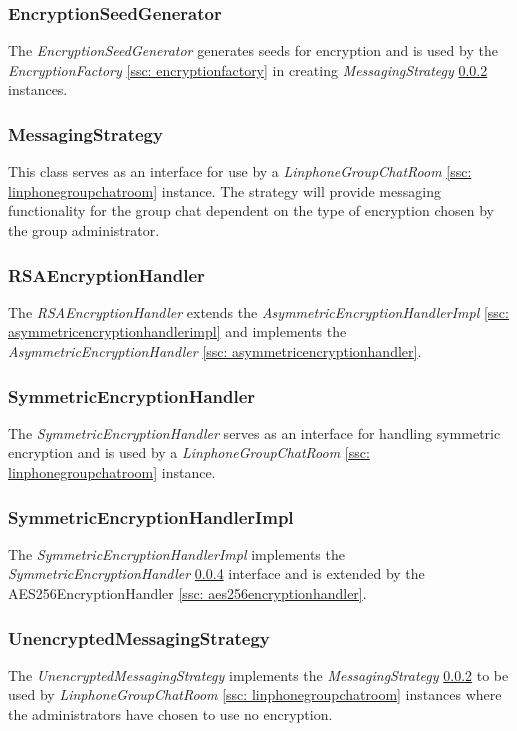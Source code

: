 \documentclass[11pt]{article}
\begin{document}
\subsubsection{EncryptionSeedGenerator}\label{ssc: encryptionseedgenerator}
The \textit{EncryptionSeedGenerator} generates seeds for encryption and is used by the \textit{EncryptionFactory} \ref{ssc: encryptionfactory} in creating \textit{MessagingStrategy} \ref{ssc: messagingstrategy} instances.
\subsubsection{MessagingStrategy}\label{ssc: messagingstrategy}
This class serves as an interface for use by a \textit{LinphoneGroupChatRoom} \ref{ssc: linphonegroupchatroom}  instance. The strategy will provide messaging functionality for the group chat dependent on the type of encryption chosen by the group administrator.
\subsubsection{RSAEncryptionHandler}\label{ssc: rsaencryptionhandler}
The \textit{RSAEncryptionHandler} extends the \textit{AsymmetricEncryptionHandlerImpl} \ref{ssc: asymmetricencryptionhandlerimpl}  and implements the \textit{AsymmetricEncryptionHandler} \ref{ssc: asymmetricencryptionhandler}.
\subsubsection{SymmetricEncryptionHandler}\label{ssc: symmetricencryptionhandler}
The \textit{SymmetricEncryptionHandler} serves as an interface for handling symmetric encryption and is used by a \textit{LinphoneGroupChatRoom} \ref{ssc: linphonegroupchatroom} instance.
\subsubsection{SymmetricEncryptionHandlerImpl}\label{ssc: symmetricencryptionhandlerimpl}
The \textit{SymmetricEncryptionHandlerImpl} implements the \textit{SymmetricEncryptionHandler} \ref{ssc: symmetricencryptionhandler} interface and is extended by the AES256EncryptionHandler \ref{ssc: aes256encryptionhandler}.
\subsubsection{UnencryptedMessagingStrategy}\label{unencryptedmessaginstrategy}
The \textit{UnencryptedMessagingStrategy} implements the \textit{MessagingStrategy} \ref{ssc: messagingstrategy} to be used by \textit{LinphoneGroupChatRoom} \ref{ssc: linphonegroupchatroom} instances where the administrators have chosen to use no encryption.
\end{document}
